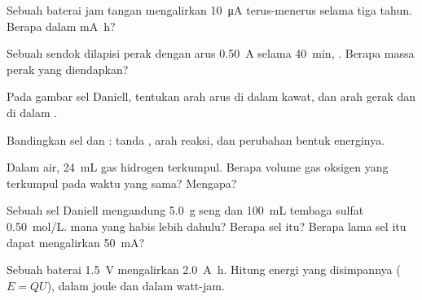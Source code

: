 \begin{exercise}[$\star\star$]\label{exo:g12:cells-and-electrolysis:7}
Sebuah baterai jam tangan mengalirkan \qty{10}{\micro A} terus-menerus
selama tiga tahun. Berapa  dalam \si{mA.h}?
\end{exercise}

\begin{exercise}[$\star\star$]\label{exo:g12:cells-and-electrolysis:8}
Sebuah sendok dilapisi perak dengan arus \qty{0.50}{A} selama
\qty{40}{min}, . Berapa massa perak yang diendapkan?
\end{exercise}

\begin{exercise}[$\star\star$]\label{exo:g12:cells-and-electrolysis:9}
Pada gambar sel Daniell, tentukan arah arus di dalam kawat, dan arah
gerak   dan  di dalam .
\end{exercise}

\begin{exercise}[$\star\star$]\label{exo:g12:cells-and-electrolysis:10}
Bandingkan sel dan : tanda , arah reaksi, dan
perubahan bentuk energinya.
\end{exercise}

\begin{exercise}[$\star\star$]\label{exo:g12:cells-and-electrolysis:11}
Dalam  air, \qty{24}{mL} gas hidrogen terkumpul. Berapa
volume gas oksigen yang terkumpul pada waktu yang sama? Mengapa?
\end{exercise}

\begin{exercise}[$\star\star\star$]\label{exo:g12:cells-and-electrolysis:12}
Sebuah sel Daniell mengandung \qty{5.0}{g} seng dan \qty{100}{mL}
tembaga sulfat \qty{0.50}{mol/L}.  mana yang habis lebih
dahulu? Berapa  sel itu? Berapa lama sel itu dapat mengalirkan
\qty{50}{mA}?
\end{exercise}

\begin{exercise}[$\star\star\star$]\label{exo:g12:cells-and-electrolysis:13}
Sebuah baterai \qty{1.5}{V} mengalirkan \qty{2.0}{A.h}. Hitung energi
yang disimpannya ($E = Q U$), dalam joule dan dalam watt-jam.
\end{exercise}

